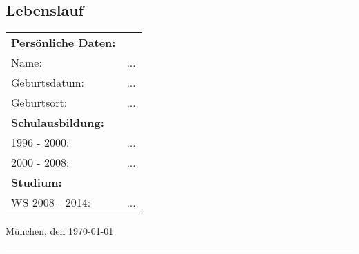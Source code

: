 \documentclass[12pt,letterpaper]{article} %
\begin{document}
\subsection*{Lebenslauf}
\label{lebenslauf}
\vspace*{0.5cm}

\begin{table}[h]
\begin{tabularx}{\textwidth}{ l  X }
\textbf{Persönliche Daten:} & \\
  Name: & ...\\
  Geburtsdatum: & ... \\
  Geburtsort: & ...\\[1.0cm]
\textbf{Schulausbildung:} & \\
  1996 - 2000: & ...\\
  2000 - 2008: & ...\\[1.0cm]  
\textbf{Studium:} & \\
  WS 2008 - 2014: & ...\\[1.0cm]
\end{tabularx}
\end{table}

\noindent
München, den \today \\[2.0cm]
\rule{6.0cm}{0.4pt} \\
\end{document}

